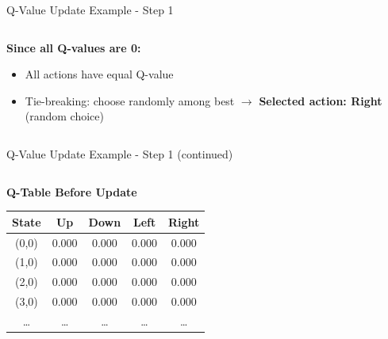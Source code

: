 \documentclass[aspectratio=169]{beamer}
\begin{document}
\begin{frame}{Q-Value Update Example - Step 1}
\begin{columns}
\begin{column}{0.55\textwidth}
            \textbf{Since all Q-values are 0:}
            \begin{itemize}
                \item All actions have equal Q-value
                \item Tie-breaking: choose randomly among best $\rightarrow$ \textbf{Selected action: Right} (random choice)
            \end{itemize}
        \end{column}
    \end{columns}
\end{frame}

\begin{frame}{Q-Value Update Example - Step 1 (continued)}
   
    
    \begin{columns}
        \begin{column}{0.5\textwidth}
            \textbf{Q-Table Before Update}
            \small
            \begin{table}[h]
                \centering
                \begin{tabular}{|c|c|c|c|c|}
                    \hline
                    \textbf{State} & \textbf{Up} & \textbf{Down} & \textbf{Left} & \textbf{Right} \\
                    \hline
                    (0,0) & 0.000 & 0.000 & 0.000 & 0.000 \\
                    (1,0) & 0.000 & 0.000 & 0.000 & 0.000 \\
                    (2,0) & 0.000 & 0.000 & 0.000 & 0.000 \\
                    (3,0) & 0.000 & 0.000 & 0.000 & 0.000 \\
                    \dots & \dots & \dots & \dots & \dots \\
                    \hline
                \end{tabular}
            \end{table}
            

\end{column}
\end{columns}
\end{frame}
\end{document}
